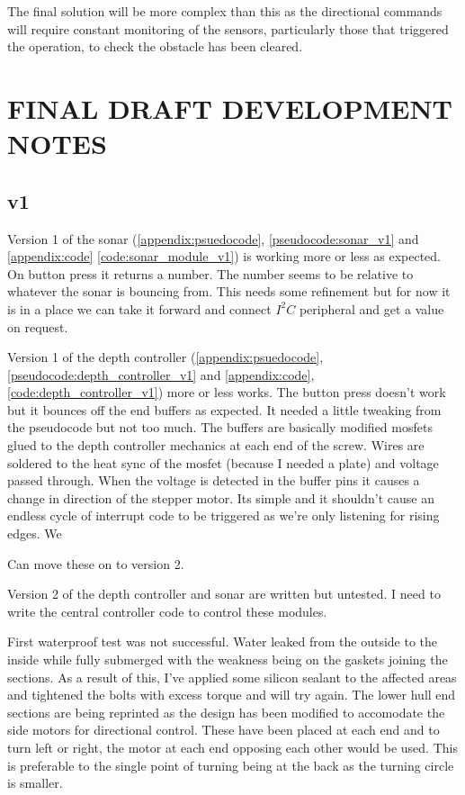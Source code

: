 \documentclass[11pt,a4paper,titlepage]{report}
\begin{document}
	The final solution will be more complex than this as the directional commands will require constant monitoring of the sensors, particularly those that triggered the operation, to check the obstacle has been cleared. 
	
	
	\chapter*{FINAL DRAFT DEVELOPMENT NOTES}
	\section{v1}
	Version 1 of the sonar (\ref{appendix:psuedocode}, \ref{pseudocode:sonar_v1} and \ref{appendix:code} \ref{code:sonar_module_v1}) is working more or less as expected. On button press it returns a number. The number seems to be relative to whatever the sonar is bouncing from. This needs some refinement but for now it is in a place we can take it forward and connect $I^{2}C$ peripheral and get a value on request. 
	
	Version 1 of the depth controller (\ref{appendix:psuedocode}, \ref{pseudocode:depth_controller_v1} and \ref{appendix:code}, \ref{code:depth_controller_v1}) more or less works. The button press doesn't work but it bounces off the end buffers as expected. It needed a little tweaking from the pseudocode but not too much. The buffers are basically modified mosfets glued to the depth controller mechanics at each end of the screw. Wires are soldered to the heat sync of the mosfet (because I needed a plate) and voltage passed through. When the voltage is detected in the buffer pins it causes a change in direction of the stepper motor. Its simple and it shouldn't cause an endless cycle of interrupt code to be triggered as we're only listening for rising edges. We 
	
	Can move these on to version 2.
	
	Version 2 of the depth controller and sonar are written but untested. I need to write the central controller code to control these modules. 
	
	First waterproof test was not successful. Water leaked from the outside to the inside while fully submerged with the weakness being on the gaskets joining the sections. As a result of this, I've applied some silicon sealant to the affected areas and tightened the bolts with excess torque and will try again. The lower hull end sections are being reprinted as the design has been modified to accomodate the side motors for directional control. These have been placed at each end and to turn left or right, the motor at each end opposing each other would be used. This is preferable to the single point of turning being at the back as the turning circle is smaller. 
	
\end{document}
